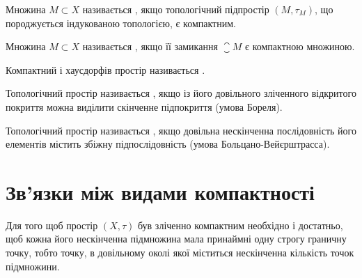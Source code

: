 \begin{definition}
Множина $M \subset X$ називається , якщо топологічний підпростір $(M, \tau_M)$,
що породжується індукованою топологією, є компактним.
\end{definition}

\begin{definition}
Множина $M \subset X$ називається , якщо її замикання
$\closure M$ є компактною множиною.
\end{definition}

\begin{definition}
Компактний і хаусдорфів простір називається
.
\end{definition}

\begin{definition}
Топологічний простір називається
, якщо із його довільного зліченного
відкритого покриття можна виділити скінченне
підпокриття (умова Бореля).
\end{definition}

\begin{definition}
Топологічний простір називається
, якщо довільна нескінченна
послідовність його елементів містить збіжну
підпослідовність (умова Больцано-Вейєрштрасса).
\end{definition}

\section{Зв'язки між видами компактності}

\begin{theorem}
Для того щоб простір $(X, \tau)$ був зліченно
компактним необхідно і достатньо, щоб кожна його
нескінченна підмножина мала принаймні одну строгу
граничну точку, тобто точку, в довільному околі якої
міститься нескінченна кількість точок підмножини.
\end{theorem}

